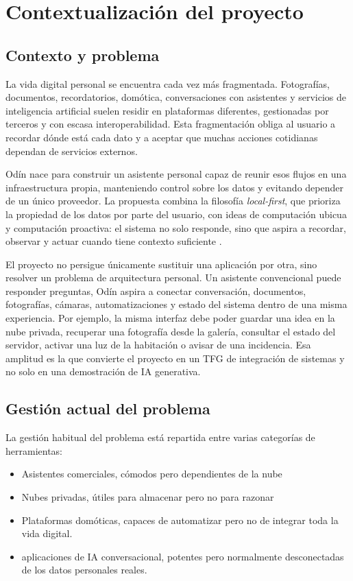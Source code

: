 \chapter{Contextualización del proyecto}

\section{Contexto y problema}
La vida digital personal se encuentra cada vez más fragmentada. Fotografías, documentos, recordatorios, domótica, conversaciones con asistentes y servicios de inteligencia artificial suelen residir en plataformas diferentes, gestionadas por terceros y con escasa interoperabilidad. Esta fragmentación obliga al usuario a recordar dónde está cada dato y a aceptar que muchas acciones cotidianas dependan de servicios externos.

Odín nace para construir un asistente personal capaz de reunir esos flujos en una infraestructura propia, manteniendo control sobre los datos y evitando depender de un único proveedor. La propuesta combina la filosofía \textit{local-first}, que prioriza la propiedad de los datos por parte del usuario, con ideas de computación ubicua y computación proactiva: el sistema no solo responde, sino que aspira a recordar, observar y actuar cuando tiene contexto suficiente \citep{kleppmann2019localfirst,weiser1991computer,tennenhouse2000proactive}.

El proyecto no persigue únicamente sustituir una aplicación por otra, sino resolver un problema de arquitectura personal. Un asistente convencional puede responder preguntas, Odín aspira a conectar conversación, documentos, fotografías, cámaras, automatizaciones y estado del sistema dentro de una misma experiencia. Por ejemplo, la misma interfaz debe poder guardar una idea en la nube privada, recuperar una fotografía desde la galería, consultar el estado del servidor, activar una luz de la habitación o avisar de una incidencia. Esa amplitud es la que convierte el proyecto en un TFG de integración de sistemas y no solo en una demostración de IA generativa.

\section{Gestión actual del problema}
La gestión habitual del problema está repartida entre varias categorías de herramientas:
\begin{itemize}
  \item Asistentes comerciales, cómodos pero dependientes de la nube
  \item Nubes privadas, útiles para almacenar pero no para razonar
  \item Plataformas domóticas, capaces de automatizar pero no de integrar toda la vida digital.
  \item aplicaciones de IA conversacional, potentes pero normalmente desconectadas de los datos personales reales.
\end{itemize}

